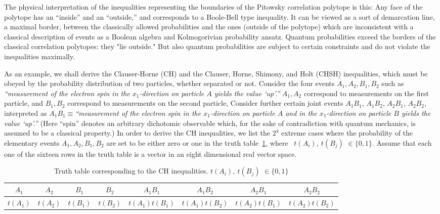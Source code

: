\documentclass{epl}
\begin{document}
The physical interpretation of the inequalities representing the boundaries of the
Pitowsky correlation polytope is  this:
Any face of the polytope has an ``inside'' and an ``outside,''
and corresponds to a Boole-Bell type inequality.
It can be viewed as a sort of demarcation line,
a maximal border, between the classically allowed probabilities
and the ones (outside of the polytope) which are inconsistent
with a classical description
of events as a Boolean algebra and Kolmogorivian probability ansatz.
Quantum probabilities exceed the borders of the classical correlation
polytopes: they "lie outside."
But also quantum probabilities are subject to certain constraints
\cite{cirelson:80,cirelson:87,cirelson,pit:range-2001}
and do not violate
the inequalities maximally.

As an example, we shall derive the Clauser-Horne (CH)
and the Clauser, Horne, Shimony, and Holt (CHSH) inequalities,
which must be obeyed by the probability distribution of two particles, whether separated or not.
Consider the four events $A_{1},A_{2},B_{1},B_{2}$
such as {\em ``measurement of
the electron spin in the $x_1$-direction on particle $A$ yields the value `up'.''}
 $A_{1},A_{2}$
correspond to
measurements on the first particle,
and $B_{1},B_{2}$
correspond to
measurements on the second particle,
Consider further
certain joint events
$A_1B_1$,
$A_1B_2$,
$A_2B_1$,
$A_2B_2$, interpreted as $A_1B_1\equiv${\em ``measurement of
the electron spin
in the $x_1$-direction on particle $A$
and
in the $x_1$-direction on particle $B$
yields the value `up'.''}
(Here ``spin'' denotes an arbitrary dichotomic observable which,
for the sake of contradiction with quantum mechanics,
is assumed to be a classical property.)
In order to derive the
CH inequalities, we list the $2^4$ extreme cases where the probability of
the
elementary events $A_{1},A_{2},B_{1},B_{2}$ are set to be either zero or
one in the truth table~\ref{t-tt-2000-poly},
where \ $t(A_{i}),\ t(B_{j})$ $\in \{0,1\}$.
Assume that each one of the sixteen
rows in the truth table is
a vector in an eight dimensional real vector space.
\begin{table}
\caption{Truth table corresponding to the CH inequalities.
$t(A_{i}),\ t(B_{j})$ $\in \{0,1\}$ \label{t-tt-2000-poly}}
\begin{tabular}{cccccccc}
\hline\hline
$A_{1}$ & $A_{2}$ & $B_{1}$ & $B_{2}$&
$A_{1}B_{1}$& $A_{1}B_{2}$ &$A_{2}B_{1}$ & $A_{2}B_{2}$ \\
\hline
$t(A_{1})$ & $t(A_{2})$ & $t(B_{1})$ & $t(B_{2})$&
$t(A_{1})t(B_{1})$& $t(A_{1})t(B_{2})$ & $t(A_{2})t(B_{1})$ & $t(A_{2})t(B_{2})$ \\
\hline\hline
\end{tabular}
\end{table}
\end{document}
